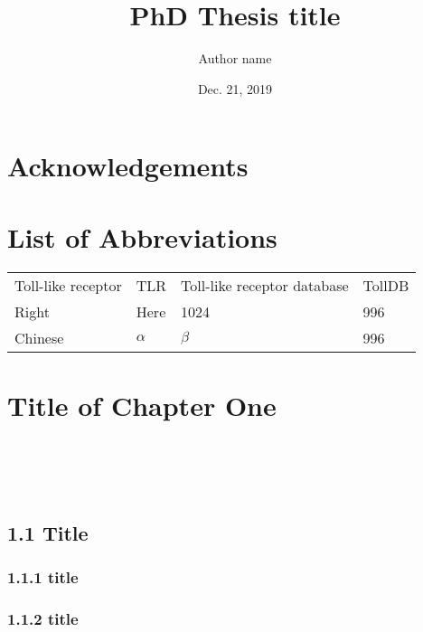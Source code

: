 \documentclass[a4paper, 14pt, UTF8, openright]{book}
\title{\Huge \bfseries PhD Thesis title}
\author{Author name}
\date{Dec. 21, 2019}
\begin{document}
\begin{titlepage}
\maketitle
\thispagestyle{empty}
\end{titlepage}


\tableofcontents
\thispagestyle{empty}

\newpage
\thispagestyle{empty}

\frontmatter
\chapter*{Acknowledgements}
\lipsum[1-5]

\chapter*{List of Abbreviations}
\begin{tabular}{ll||ll}
	Toll-like receptor & TLR & Toll-like receptor database & TollDB \\
	Right    & Here      & 1024 & 996 \\
	Chinese  & $\alpha$  & $\beta$  & 996 \\
\end{tabular}

\mainmatter
\chapter{Title of Chapter One}

 \\
 \\
 \\

\lipsum[1-5]

\section{1.1 Title}
\lipsum[1-10]

\subsection{1.1.1 title}
\lipsum[1-5]

\subsection{1.1.2 title}
\lipsum[1-5]
\end{document}
